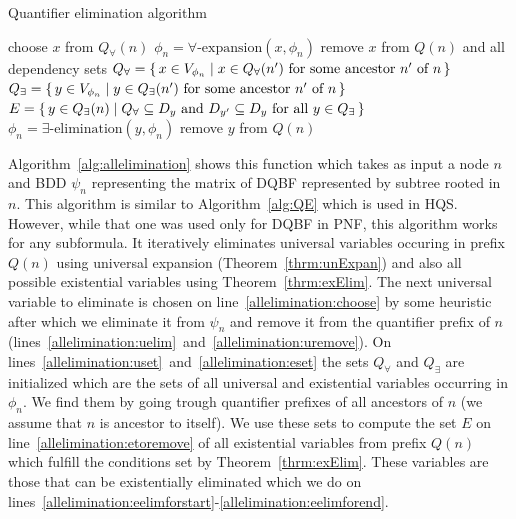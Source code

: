 \documentclass[
  digital, %
  color,
  twoside, %
  table,   %
  nolof,     %
  nolot,     %
]{fithesis3}
\let\setbuilder\set
\newcommand{\simpleset}[1]{\{{#1}\}}
\renewcommand{\set}[1]{\normalexpandarg\IfSubStr{#1}{|}{\setbuilder{#1}}{\simpleset{#1}}}
\theoremstyle{definition}
\theoremstyle{remark}
\newcommand{\vars}[1]{V_{#1}}
\newcommand{\prefix}[1]{Q({#1})}
\newcommand{\eprefix}[1]{Q_{\exists}(#1)}
\newcommand{\uprefix}[1]{Q_{\forall}(#1)}
\begin{document}
\begin{algorithm}
  \caption{Quantifier elimination algorithm}
  \label{alg:allelimination}
  \begin{algorithmic}[1]
      \While{$\uprefix{n}$ is not empty}%
        \State choose $x$ from $\uprefix{n}$\label{allelimination:choose}
        \State $\phi_n = \forall\text{-expansion}(x,\phi_n)$ \label{allelimination:uelim}
        \State remove $x$ from $\prefix{n}$\label{allelimination:uremove} and all dependency sets
        \State $Q_{\forall} = \set{x \in \vars{\phi_n} | x \in \uprefix{n'} \text{ for some ancestor } n' \text{ of } n}$\label{allelimination:uset}
        \State $Q_{\exists} = \set{y \in \vars{\phi_n} | y \in \eprefix{n'} \text{ for some ancestor } n' \text{ of } n}$\label{allelimination:eset}
        \State $E = \set{y \in \eprefix{n} | Q_{\forall} \subseteq D_y \text{ and } D_{y'} \subseteq D_y \text{ for all } y \in Q_{\exists}}$\label{allelimination:etoremove}
        \label{allelimination:eelimforstart}
          \State $\phi_n = \exists\text{-elimination}(y,\phi_n)$\label{allelimination:eelim}
          \State remove $y$ from $\prefix{n}$\label{allelimination:eremove}
        \EndFor\label{allelimination:eelimforend}
      \EndWhile
    \EndFunction
  \end{algorithmic}
\end{algorithm}

Algorithm~\ref{alg:allelimination} shows this function which takes as input a node $n$ and BDD $\psi_n$ representing the matrix of DQBF represented by subtree rooted in $n$. This algorithm is similar to Algorithm~\ref{alg:QE} which is used in HQS. However, while that one was used only for DQBF in PNF, this algorithm works for any subformula. It iteratively eliminates universal variables occuring in prefix $\prefix{n}$ using universal expansion (Theorem~\ref{thrm:unExpan}) and also all possible existential variables using Theorem~\ref{thrm:exElim}. The next universal variable to eliminate is chosen on line~\ref{allelimination:choose} by some heuristic after which we eliminate it from $\psi_n$ and remove it from the quantifier prefix of $n$ (lines~\ref{allelimination:uelim}~and~\ref{allelimination:uremove}). On lines~\ref{allelimination:uset}~and~\ref{allelimination:eset} the sets $Q_{\forall}$ and $Q_{\exists}$ are initialized which are the sets of all universal and existential variables occurring in $\phi_n$. We find them by going trough quantifier prefixes of all ancestors of $n$ (we assume that $n$ is ancestor to itself). We use these sets to compute the set $E$ on line~\ref{allelimination:etoremove} of all existential variables from prefix $\prefix{n}$ which fulfill the conditions set by Theorem~\ref{thrm:exElim}. These variables are those that can be existentially eliminated which we do on lines~\ref{allelimination:eelimforstart}-\ref{allelimination:eelimforend}.
\end{document}
